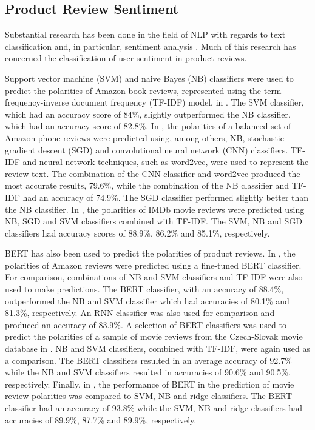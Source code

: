 \subsection{Product Review Sentiment} \label{sec:LR_NLP_Sent}

Substantial research has been done in the field of NLP with regards to text classification and, in particular, sentiment analysis \cite{mironczuk2018recent}. Much of this research has concerned the classification of user sentiment in product reviews.

Support vector machine (SVM) and naive Bayes (NB) classifiers were used to predict the polarities of Amazon book reviews, represented using the term frequency-inverse document frequency (TF-IDF) model, in \cite{dey2020comparative}. The SVM classifier, which had an accuracy score of 84\%, slightly outperformed the NB classifier, which had an accuracy score of 82.8\%. In \cite{aljuhani2019comparison}, the polarities of a balanced set of Amazon phone reviews were predicted using, among others, NB, stochastic gradient descent (SGD) and convolutional neural network (CNN) classifiers. TF-IDF and neural network techniques, such as word2vec, were used to represent the review text. The combination of the CNN classifier and word2vec produced the most accurate results, 79.6\%, while the combination of the NB classifier and TF-IDF had an accuracy of 74.9\%. The SGD classifier performed slightly better than the NB classifier. In \cite{tripathy2016classification}, the polarities of IMDb movie reviews were predicted using NB, SGD and SVM classifiers combined with TF-IDF. The SVM, NB and SGD classifiers had accuracy scores of 88.9\%, 86.2\% and 85.1\%, respectively.

BERT has also been used to predict the polarities of product reviews. In \cite{geetha2021improving}, the polarities of Amazon reviews were predicted using a fine-tuned BERT classifier. For comparison, combinations of NB and SVM classifiers and TF-IDF were also used to make predictions. The BERT classifier, with an accuracy of 88.4\%, outperformed the NB and SVM classifier which had accuracies of 80.1\% and 81.3\%, respectively. An RNN classifier was also used for comparison and produced an accuracy of 83.9\%. A selection of BERT classifiers was used to predict the polarities of a sample of movie reviews from the Czech-Slovak movie database in \cite{lehevcka2020bert}. NB and SVM classifiers, combined with TF-IDF, were again used as a comparison. The BERT classifiers resulted in an average accuracy of 92.7\% while the NB and SVM classifiers resulted in accuracies of 90.6\% and 90.5\%, respectively. Finally, in \cite{gonzalez2020comparing}, the performance of BERT in the prediction of movie review polarities was compared to SVM, NB and ridge classifiers. The BERT classifier had an accuracy of 93.8\% while the SVM, NB and ridge classifiers had accuracies of 89.9\%, 87.7\% and 89.9\%, respectively.


